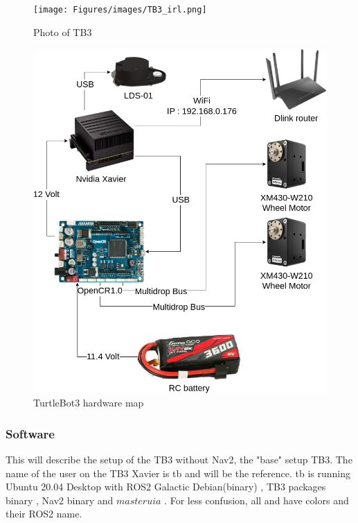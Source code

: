 \begin{figure}[H]
  \centering
  \begin{minipage}[b]{0.4\textwidth}
    \texttt{[image: Figures/images/TB3\_irl.png]}
    \caption{Photo of TB3}
    \label{fig:TB3_irl}
  \end{minipage}
  \hfill
  \begin{minipage}[b]{0.59\textwidth}
    \includegraphics[width=\textwidth]{Figures/drawio/TB3_HW.drawio.png}
    \caption{TurtleBot3 hardware map}
    \label{fig:TB3HW}
  \end{minipage}
\end{figure}


\subsubsection{Software}

This will describe the setup of the TB3 without Nav2, the "base" setup TB3.  
The name of the user on the TB3 Xavier is tb and will be the reference. tb is running Ubuntu 20.04 Desktop \cite{ubuntu20_04} with ROS2 Galactic Debian(binary) \cite{rosgalacticinstall}, TB3 packages binary \cite{turtlebot3galactic}, Nav2 binary \cite{rosnavinstall} and $masteruia$ \cite{masteruia}. For less confusion, all  and  have colors and their ROS2 name.


